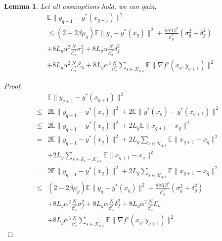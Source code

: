 \documentclass[lettersize,journal]{IEEEtran}
\newtheorem{lemma}{Lemma}
\begin{document}
\begin{lemma}
    Let all assumptions hold, we can gain,
    \begin{align}
    &\mathbb{E}\|y_{q+1}-y^*(x_{q+1})\|^2\\
    &\leq(2-2\beta\mu_g)\mathbb{E}\|y_{q}-y^*(x_q)\|^2+\frac{8NT\beta^2}{\mathcal{C}_y^*}(\sigma_{g}^2+\delta_{g}^2)\nonumber\\&+ 8L_y\alpha^2\frac{N}{\mathcal{C}_x^*}\sigma_f^2+8L_y\alpha\frac{N}{\mathcal{C}_x^*}\delta^2_f\nonumber\\
    &+8L_y\alpha^2\frac{N}{\mathcal{C}_x^*}\mathcal{E}_h+8L_y\alpha^3\frac{N}{\mathcal{C}_x^*}\sum_{s\in \mathcal{K}_{q,x}}\mathbb{E}\|\nabla f^s(x_{q},y_{q+1})\|^2\nonumber
    \end{align}
\end{lemma}
\begin{proof}
\begin{align*}
    &\mathbb{E}\|y_{q+1}-y^*(x_{q+1})\|^2\\
    \leq &2\mathbb{E}\|y_{q+1}-y^*(x_{q})\|^2+2\mathbb{E}\|y^*(x_{q})-y^*(x_{q+1})\|^2\\
    \leq&2\mathbb{E}\|y_{q+1}-y^*(x_{q})\|^2+2L_y\mathbb{E}\|x_{q+1}-x_{q}\|^2\\
    =&2\mathbb{E}\|y_{q+1}-y^*(x_{q})\|^2+2L_y\sum_{s\in \mathcal{K}_{q,x}}\mathbb{E}\|x_{q+1}-x_{q}\|^2\\&+2L_y\sum_{s\in \mathcal{S}_x-\mathcal{K}_{q,x}}\mathbb{E}\|x_{q+1}-x_{q}\|^2 \\
    =&2\mathbb{E}\|y_{q+1}-y^*(x_{q})\|^2+2L_y\sum_{s\in \mathcal{K}_{q,x}}\mathbb{E}\|x_{q+1}-x_{q}\|^2\\
    \leq&(2-2\beta\mu_g)\mathbb{E}\|y_{q}-y^*(x_q)\|^2+\frac{8NT\beta^2}{\mathcal{C}_y^*}(\sigma_{g}^2+\delta_{g}^2)\\&+ 8L_y\alpha^2\frac{N}{\mathcal{C}_x^*}\sigma_f^2+8L_y\alpha\frac{N}{\mathcal{C}_x^*}\delta^2_f+8L_y\alpha^2\frac{N}{\mathcal{C}_x^*}\mathcal{E}_h\\
    &+8L_y\alpha^3\frac{N}{\mathcal{C}_x^*}\sum_{s\in \mathcal{K}_{q,x}}\mathbb{E}\|\nabla f^s(x_{q},y_{q+1})\|^2
\end{align*}
\end{proof}
\end{document}
